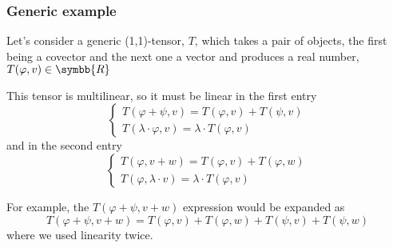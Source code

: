 \subsubsection{Generic example}
Let's consider a generic (1,1)-tensor, $T$, which takes a pair of objects, the first being a
covector and the next one a vector and produces a real number, $T(\varphi, v)\in\symbb{R}$
\begin{center}
\end{center}
This tensor is multilinear, so it must be linear in the first entry
\[
  \left\{
    \begin{array}{ll}
      T(\varphi + \psi,v) = T(\varphi,v) + T(\psi,v)\\
      T(\lambda\cdot\varphi,v) = \lambda\cdot T(\varphi,v)
    \end{array}
    \right.
\]
and in the second entry
\[
  \left\{
    \begin{array}{ll}
      T(\varphi,v + w) = T(\varphi,v) + T(\varphi,w)\\
      T(\varphi,\lambda\cdot v) = \lambda\cdot T(\varphi,v)
    \end{array}
    \right.
\]

For example, the $T(\varphi + \psi, v + w)$ expression would be expanded as
\[
  T(\varphi + \psi, v + w)
  = T(\varphi,v) + T(\varphi,w) + T(\psi,v) + T(\psi,w)
\]
where we used linearity twice.

